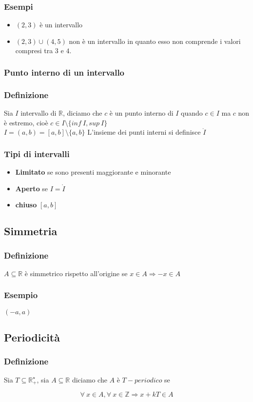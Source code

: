 \subsubsection*{Esempi}
\begin{itemize}
    \item $(2,3)$ è un intervallo
    \item $(2,3) \cup (4,5)$ non è un intervallo in quanto esso non comprende i valori compresi tra $3$ e $4$.
\end{itemize}
\subsubsection{Punto interno di un intervallo}
\subsubsection*{Definizione}
Sia $I$ intervallo di $\mathbb{R}$, diciamo che $c$ è un punto interno di $I$ quando $c \in I$ ma $c$ non è estremo,
cioè $c \in I \setminus \{inf\ I, sup\ I\}$\\
$I = (a,b)=[a,b]\setminus\{a,b\}$
L'insieme dei punti interni si definisce $\mathring{I}$
\subsubsection{Tipi di intervalli}
\begin{itemize}
    \item \textbf{Limitato} se sono presenti maggiorante e minorante
    \item \textbf{Aperto} se $I = \mathring{I}$
    \item \textbf{chiuso} $[a,b]$ 
\end{itemize}
\subsection{Simmetria}
\subsubsection*{Definizione}
$A \subseteq \mathbb{R}$ è simmetrico rispetto all'origine se $x \in A \Rightarrow -x \in A$
\subsubsection*{Esempio}
$(-a,a)$
\subsection{Periodicità}
\subsubsection*{Definizione}
Sia $T \subseteq \mathbb{R}_{+}^{\star}$, sia $A \subseteq \mathbb{R}$ diciamo che $A$ è $T-periodico$ se\\
\begin{Large}
    \begin{equation*}
        \forall\ x \in A, \forall\ x \in \mathbb{Z} \Rightarrow x + kT \in A
    \end{equation*}
\end{Large}